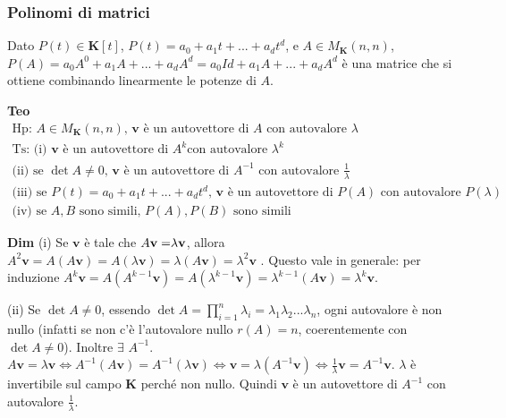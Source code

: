 \documentclass{article}
\begin{document}
\subsubsection{Polinomi di matrici}

Dato $P\left( t\right) \in \mathbf{K}\left[ t\right] $, $P\left( t\right)
=a_{0}+a_{1}t+...+a_{d}t^{d}$, e $A\in M_{\mathbf{K}}\left( n,n\right) $, $%
P\left( A\right)
=a_{0}A^{0}+a_{1}A+...+a_{d}A^{d}=a_{0}Id+a_{1}A+...+a_{d}A^{d}$ \`{e} una
matrice che si ottiene combinando linearmente le potenze di $A$.

\textbf{Teo} 
\begin{gather*}
\text{Hp}\text{: }A\in M_{\mathbf{K}}\left( n,n\right) \text{, }\mathbf{v}%
\text{ \`{e} un autovettore di }A\text{ con autovalore }\lambda \\
\text{Ts}\text{: (i) }\mathbf{v}\text{ \`{e} un autovettore di }A^{k}\text{
con autovalore }\lambda ^{k} \\
\text{(ii) se }\det A\neq 0\text{, }\mathbf{v}\text{ \`{e} un autovettore di 
}A^{-1}\text{ con autovalore }\frac{1}{\lambda } \\
\text{(iii) se }P\left( t\right) =a_{0}+a_{1}t+...+a_{d}t^{d}\text{, }%
\mathbf{v}\text{ \`{e} un autovettore di }P\left( A\right) \text{ con
autovalore }P\left( \lambda \right) \\
\text{(iv) se }A,B\text{ sono simili, }P\left( A\right) ,P\left( B\right) 
\text{ sono simili}
\end{gather*}

\textbf{Dim} (i) Se $\mathbf{v}$ \`{e} tale che $A\mathbf{v=}\lambda \mathbf{%
v}$, allora $A^{2}\mathbf{v}=A\left( A\mathbf{v}\right) =A\left( \lambda 
\mathbf{v}\right) =\lambda \left( A\mathbf{v}\right) =\lambda ^{2}\mathbf{v}$%
. Questo vale in generale: per induzione $A^{k}\mathbf{v}=A\left( A^{k-1}%
\mathbf{v}\right) =A\left( \lambda ^{k-1}\mathbf{v}\right) =\lambda
^{k-1}\left( A\mathbf{v}\right) =\lambda ^{k}\mathbf{v}$.

(ii) Se $\det A\neq 0$, essendo $\det A=\prod_{i=1}^{n}\lambda _{i}=\lambda
_{1}\lambda _{2}...\lambda _{n}$, ogni autovalore \`{e} non nullo (infatti
se non c'\`{e} l'autovalore nullo $r\left( A\right) =n$, coerentemente con $%
\det A\neq 0$). Inoltre $\exists $ $A^{-1}$. $A\mathbf{v}=\lambda \mathbf{v}%
\Longleftrightarrow A^{-1}\left( A\mathbf{v}\right) =A^{-1}\left( \lambda 
\mathbf{v}\right) \Longleftrightarrow \mathbf{v}=\lambda \left( A^{-1}%
\mathbf{v}\right) \Longleftrightarrow \frac{1}{\lambda }\mathbf{v}=A^{-1}%
\mathbf{v}$. $\lambda $ \`{e} invertibile sul campo $\mathbf{K}$ perch\'{e}
non nullo. Quindi $\mathbf{v}$ \`{e} un autovettore di $A^{-1}$ con
autovalore $\frac{1}{\lambda }$.
\end{document}
